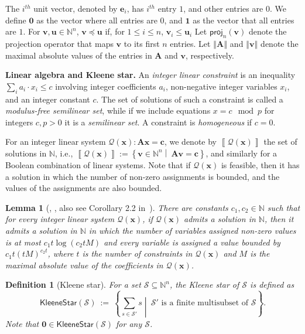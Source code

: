 \documentclass[10pt,a4paper]{article}
\newtheorem{lemma}[theorem]{Lemma}
\newtheorem{definition}[theorem]{Definition}
\theoremstyle{definition}
\theoremstyle{remark}
\newcommand{\myparagraph}[1]{\medskip\noindent \textbf{#1.}}
\newcommand{\cQ}{\mathcal{Q}}
\newcommand{\cS}{\mathcal{S}}
\newcommand{\bbN}{\mathbb{N}}
\newcommand{\bfA}{\mathbf{A}}
\newcommand{\bfc}{\mathbf{c}}
\newcommand{\bfe}{\mathbf{e}}
\newcommand{\bfu}{\mathbf{u}}
\newcommand{\bfv}{\mathbf{v}}
\newcommand{\bfx}{\mathbf{x}}
\newcommand{\bfzero}{\mathbf{0}}
\newcommand{\bfone}{\mathbf{1}}
\newcommand{\setc}[2]        {\left\{ #1 \middle|\  #2 \right\}}
\newcommand{\norm}[1]        {\left\Vert #1 \right\Vert}
\newcommand{\projp}[2]     {\mathsf{proj}_{ #1 }\left( #2 \right)}
\newcommand{\kstar}[1] {\mathsf{KleeneStar}\left( #1 \right)}
\newcommand{\sol}[1] {\left\llbracket #1 \right\rrbracket}
\newcommand{\vle} {\preccurlyeq}
\newcommand{\unit}[1] {\bfe_{ #1 }}
\begin{document}
The $i^{th}$ unit vector, denoted by $\unit{i}$,
has $i^{th}$ entry $1$, and other entries are $0$.
We define $\bfzero$ as the vector where all entries are $0$,
and $\bfone$ as the vector that all entries are $1$.
For  $\bfv, \bfu \in \bbN^n$,
$\bfv \vle \bfu$ if, for $1 \le i \le n$, $\bfv_i \le \bfu_i$
Let $\projp{n}{\bfv}$ denote the projection operator that maps $\bfv$ to its first $n$ entries.
Let $\norm{\bfA}$ and $\norm{\bfv}$ denote the maximal absolute values of the entries in $\bfA$ and $\bfv$, respectively.

\myparagraph{Linear algebra and Kleene star}
An \emph{integer linear constraint} is an inequality $\sum_{i} a_i \cdot x_i \leq c$
involving integer coefficients $a_i$, non-negative integer variables $x_i$, and an integer constant $c$.
The set of solutions of such a constraint is called a \emph{modulus-free semilinear set}, while
if we include equations $x = c \mod p$ for integers $c, p>0$ it is a \emph{semilinear set}.
A constraint is \emph{homogeneous} if $c = 0$.

For an integer linear system $\cQ(\bfx): \bfA \bfx = \bfc$,
we denote by $\sol{\cQ(\bfx)}$ the set of solutions in $\bbN$,
i.e., $\sol{\cQ(\bfx)} := \setc{\bfv \in \bbN^n}{\bfA\bfv = \bfc}$, and similarly for a Boolean combination of linear systems.
Note that if $\cQ(\bfx)$ is feasible,
then it has a solution in which the number of non-zero assignments is bounded, and the values of the assignments are also bounded.

\begin{lemma}[\cite{papa}, \cite{caratheodory-integer}, also see Corollary 2.2 in~\cite{twovarpres}]\label{lem:ilp}
    There are constants $c_1, c_2 \in \bbN$ such that for every integer linear system $\cQ(\bfx)$,
    if $\cQ(\bfx)$ admits a solution in $\bbN$, then it admits a solution in $\bbN$ in which
    the number of variables assigned non-zero values is at most $c_1t\log\left(c_2tM\right)$ and
    every variable is assigned a value bounded by $c_1t(tM)^{c_2t}$,
    where $t$ is the number of constraints in $\cQ(\bfx)$ and $M$ is the maximal absolute value of the coefficients in $\cQ(\bfx)$.
\end{lemma}



\begin{definition}[Kleene star]
    For a set $\cS \subseteq \bbN^n$,
    the \emph{Kleene star} of $\cS$ is defined as
    \begin{equation*}
        \kstar{\cS}\ :=\ \setc{\sum_{s \in \cS'} s}{\text{$\cS'$ is a finite multisubset of $\cS$}}.
    \end{equation*}
    Note that $\bfzero \in \kstar{\cS}$ for any $\cS$.
\end{definition}
\end{document}
